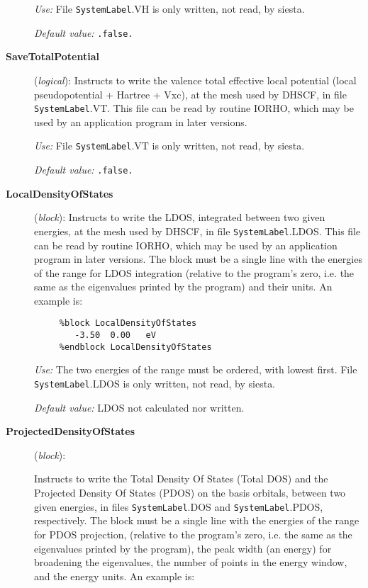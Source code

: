 \documentclass[11pt]{article}
\begin{document}
\begin{description}
{\it Use:} File {\tt SystemLabel}.VH is only written, not read, by siesta.

{\it Default value:} {\tt .false.}
        

\item[{\bf SaveTotalPotential}] ({\it logical}): 
Instructs to write the valence total effective local potential
(local pseudopotential + Hartree + Vxc), at the
mesh used by DHSCF,
in file {\tt SystemLabel}.VT. This file can be read by routine IORHO,
which may be used by an application program in later versions.

{\it Use:} File {\tt SystemLabel}.VT is only written, not read, by siesta.

{\it Default value:} {\tt .false.}
        

\item[{\bf LocalDensityOfStates}] ({\it block}): 
Instructs to write the LDOS, integrated between two given energies,
at the mesh used by DHSCF,
in file {\tt SystemLabel}.LDOS. This file can be read by routine IORHO,
which may be used by an application program in later versions.
The block must be a single line with the energies of the range for 
LDOS integration
(relative to the program's zero, i.e. the same as the eigenvalues
printed by the program) and their units.
An example is:

\begin{verbatim}
     %block LocalDensityOfStates
        -3.50  0.00   eV
     %endblock LocalDensityOfStates
\end{verbatim}

{\it Use:} The two energies of the range must be ordered,
with lowest first.
File {\tt SystemLabel}.LDOS is only written, not read, by siesta.

{\it Default value:} LDOS not calculated nor written.
        

\item[{\bf ProjectedDensityOfStates}] ({\it block}):

Instructs to write the Total Density Of States (Total DOS) and the 
Projected Density Of States (PDOS) on the basis orbitals,
between two given energies,
in files {\tt SystemLabel}.DOS and 
{\tt SystemLabel}.PDOS, respectively. 
The block must be a single line with the energies of the range for 
PDOS projection,
(relative to the program's zero, i.e. the same as the eigenvalues
printed by the program), the peak width (an energy) for broadening
the eigenvalues, the number of points in the energy window, 
and the energy units.
An example is:


\end{description}
\end{document}
